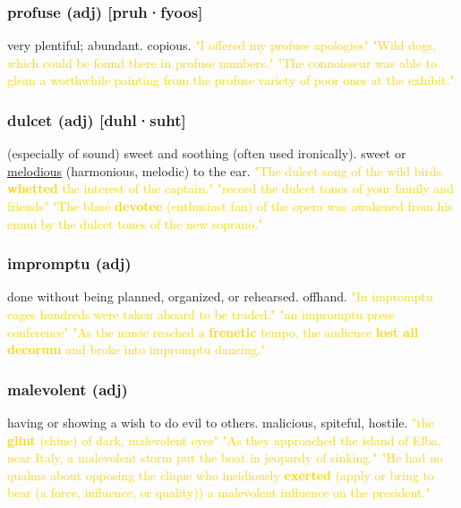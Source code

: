 \documentclass{proc}
\begin{document}
	\subsubsection{\textcolor{brickred}{profuse} (adj) [pruh·fyoos]}
	very plentiful; abundant. copious.
	\textcolor{gold}{"I offered my profuse apologies" "Wild dogs, which could be found there in profuse numbers." "The connoisseur was able to glean a worthwhile painting from the profuse variety of poor ones at the exhibit."}
	
	\subsubsection{\textcolor{brickred}{dulcet} (adj) [duhl·suht]}
	(especially of sound) sweet and soothing (often used ironically). sweet or \underline{melodious} (harmonious, melodic) to the ear.
	\textcolor{gold}{"The dulcet song of the wild birds \textbf{whetted} the interest of the captain." "record the dulcet tones of your family and friends" "The blasé \textbf{devotee} (enthusiast fan) of the opera was awakened from his ennui by the dulcet tones of the new soprano."}
	
	\subsubsection{\textcolor{brickred}{impromptu} (adj)}
	done without being planned, organized, or rehearsed. offhand.
	\textcolor{gold}{"In impromptu cages hundreds were taken aboard to be traded." "an impromptu press conference" "As the music reached a \textbf{frenetic} tempo, the audience \textbf{lost all decorum} and broke into impromptu dancing."}
	
	\subsubsection{\textcolor{brickred}{malevolent} (adj)}
	having or showing a wish to do evil to others. malicious, spiteful, hostile.
	\textcolor{gold}{"the \textbf{glint} (shine) of dark, malevolent eyes" "As they approached the island of Elba, near Italy, a malevolent storm put the boat in jeopardy of sinking." "He had no qualms about opposing the clique who insidiously \textbf{exerted} (apply or bring to bear (a force, influence, or quality)) a malevolent influence on the president."}
	
	\newpage
	\setcounter{section}{45}
	\setcounter{subsection}{0}
	
	
	\subsection{}
\end{document}
